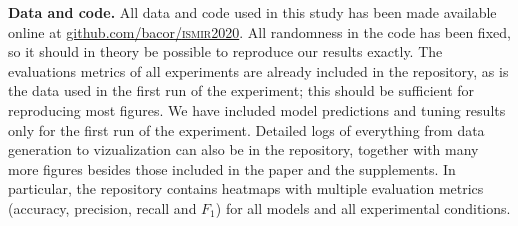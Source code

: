 \documentclass{article}
\begin{document}
\vspace{2em}

\noindent
\textbf{Data and code.}
All data and code used in this study has been made available online at \href{https://github.com/bacor/ISMIR2020}{github.com/bacor/\textsc{ismir2020}}.
All randomness in the code has been fixed, so it should in theory be possible to reproduce our results exactly.
The evaluations metrics of all experiments are already included in the repository, as is the data used in the first run of the experiment; this should be sufficient for reproducing most figures.
We have included model predictions and tuning results only for the first run of the experiment. 
Detailed logs of everything from data generation to vizualization can also be in the repository, together with many more figures besides those included in the paper and the supplements. 
In particular, the repository contains heatmaps with multiple evaluation metrics (accuracy, precision, recall and $F_1$) for all models and all experimental conditions.
\end{document}
